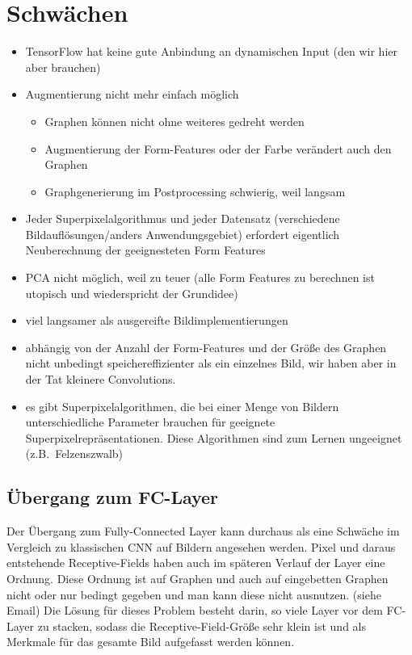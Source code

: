 \section{Schwächen}

\begin{itemize}
  \item TensorFlow hat keine gute Anbindung an dynamischen Input (den wir hier aber brauchen)
  \item Augmentierung nicht mehr einfach möglich
  \begin{itemize}
    \item Graphen können nicht ohne weiteres gedreht werden
    \item Augmentierung der Form-Features oder der Farbe verändert auch den Graphen
    \item Graphgenerierung im Postprocessing schwierig, weil langsam
  \end{itemize}
\item Jeder Superpixelalgorithmus und jeder Datensatz (verschiedene Bildauflösungen/anders Anwendungsgebiet) erfordert eigentlich Neuberechnung der geeignesteten Form Features
  \item PCA nicht möglich, weil zu teuer (alle Form Features zu berechnen ist utopisch und wiederspricht der Grundidee)
  \item viel langsamer als ausgereifte Bildimplementierungen
  \item abhängig von der Anzahl der Form-Features und der Größe des Graphen nicht unbedingt speichereffizienter als ein einzelnes Bild, wir haben aber in der Tat kleinere Convolutions.
  \item es gibt Superpixelalgorithmen, die bei einer Menge von Bildern unterschiedliche Parameter brauchen für geeignete Superpixelrepräsentationen.
    Diese Algorithmen sind zum Lernen ungeeignet (z.B.\ Felzenszwalb)
\end{itemize}

\subsection{Übergang zum FC-Layer}

Der Übergang zum Fully-Connected Layer kann durchaus als eine Schwäche im Vergleich zu klassischen CNN auf Bildern angesehen werden.
Pixel und daraus entstehende Receptive-Fields haben auch im späteren Verlauf der Layer eine Ordnung.
Diese Ordnung ist auf Graphen und auch auf eingebetten Graphen nicht oder nur bedingt gegeben und man kann diese nicht ausnutzen. (siehe Email)
Die Lösung für dieses Problem besteht darin, so viele Layer vor dem FC-Layer zu stacken, sodass die Receptive-Field-Größe sehr klein ist und als Merkmale für das gesamte Bild aufgefasst werden können.
